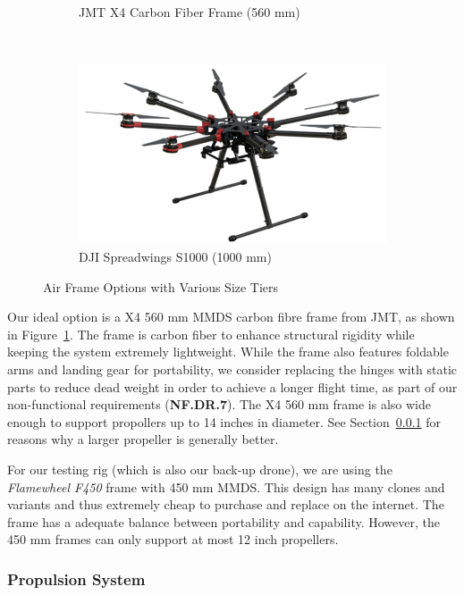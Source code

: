 \begin{figure}[h]
\begin{subfigure}[b]{0.33\textwidth}
        \caption{JMT X4 Carbon Fiber Frame (560 mm)}
        \label{fig:jmtx4}
    \end{subfigure}
    ~
    \begin{subfigure}[b]{0.33\textwidth}
        \centering
        \includegraphics[width=\textwidth]{img/djis1000}
        \caption{DJI Spreadwings S1000 (1000 mm)}
        \label{fig:djis1000}
    \end{subfigure}
    
    \caption{Air Frame Options with Various Size Tiers }
\end{figure}

Our ideal option is a X4 560 mm MMDS carbon fibre frame from JMT, as shown in Figure~\ref{fig:jmtx4}. The frame is carbon fiber to enhance structural rigidity while keeping the system extremely lightweight. While the frame also features foldable arms and landing gear for portability, we consider replacing the hinges with static parts to reduce dead weight in order to achieve a longer flight time, as part of our non-functional requirements (\textbf{NF.DR.7}). The X4 560 mm frame is also wide enough to support propollers up to 14 inches in diameter. See Section~\ref{section:propsys} for reasons why a larger propeller is generally better.

For our testing rig (which is also our back-up drone), we are using the \textit{Flamewheel F450} frame with 450 mm MMDS. This design has many clones and variants and thus extremely cheap to purchase and replace on the internet. The frame has a adequate balance between portability and capability. However, the 450 mm frames can only support at most 12 inch propellers.

\subsubsection{Propulsion System}\label{section:propsys}

